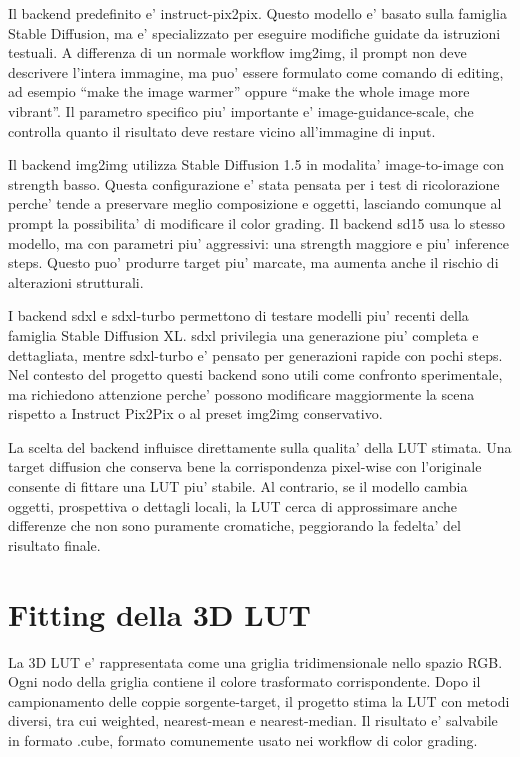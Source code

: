 \documentclass[12pt,a4paper]{report}
\renewcommand{\texttt}[1]{{\normalfont #1}}
\begin{document}
Il backend predefinito e' \texttt{instruct-pix2pix}. Questo modello e' basato sulla famiglia Stable Diffusion, ma e' specializzato per eseguire modifiche guidate da istruzioni testuali. A differenza di un normale workflow \texttt{img2img}, il prompt non deve descrivere l'intera immagine, ma puo' essere formulato come comando di editing, ad esempio ``make the image warmer'' oppure ``make the whole image more vibrant''. Il parametro specifico piu' importante e' \texttt{image-guidance-scale}, che controlla quanto il risultato deve restare vicino all'immagine di input.

Il backend \texttt{img2img} utilizza Stable Diffusion 1.5 in modalita' image-to-image con \texttt{strength} basso. Questa configurazione e' stata pensata per i test di ricolorazione perche' tende a preservare meglio composizione e oggetti, lasciando comunque al prompt la possibilita' di modificare il color grading. Il backend \texttt{sd15} usa lo stesso modello, ma con parametri piu' aggressivi: una \texttt{strength} maggiore e piu' inference steps. Questo puo' produrre target piu' marcate, ma aumenta anche il rischio di alterazioni strutturali.

I backend \texttt{sdxl} e \texttt{sdxl-turbo} permettono di testare modelli piu' recenti della famiglia Stable Diffusion XL. \texttt{sdxl} privilegia una generazione piu' completa e dettagliata, mentre \texttt{sdxl-turbo} e' pensato per generazioni rapide con pochi steps. Nel contesto del progetto questi backend sono utili come confronto sperimentale, ma richiedono attenzione perche' possono modificare maggiormente la scena rispetto a Instruct Pix2Pix o al preset \texttt{img2img} conservativo.

La scelta del backend influisce direttamente sulla qualita' della LUT stimata. Una target diffusion che conserva bene la corrispondenza pixel-wise con l'originale consente di fittare una LUT piu' stabile. Al contrario, se il modello cambia oggetti, prospettiva o dettagli locali, la LUT cerca di approssimare anche differenze che non sono puramente cromatiche, peggiorando la fedelta' del risultato finale.

\section{Fitting della 3D LUT}

La 3D LUT e' rappresentata come una griglia tridimensionale nello spazio RGB. Ogni nodo della griglia contiene il colore trasformato corrispondente. Dopo il campionamento delle coppie sorgente-target, il progetto stima la LUT con metodi diversi, tra cui \texttt{weighted}, \texttt{nearest-mean} e \texttt{nearest-median}. Il risultato e' salvabile in formato \texttt{.cube}, formato comunemente usato nei workflow di color grading.
\end{document}
